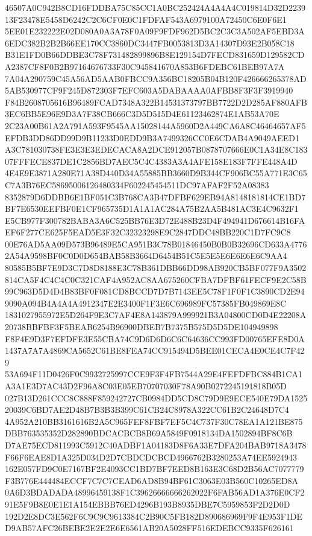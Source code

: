 \documentclass[UTF8,fontset=fandol,zihao=-4,a4paper]{ctexart}
\begin{document}
{{46507A0C942B8CD16FDDBA75C85CC1A0BC252424A4A4A4C019814D32D223913F23478E5458D6242C2C6CF0E0C1FDFAF543A6979100A72450C6E0F6E1
5EE01E232222E02D080A0A3A78F0A09F9FDF962D5BC2C3C3A502AF5EBD3A6EDC382B2B2B66EE170CC3860DC3447FB0053813D3A14307D93E2B058C18
B31E1FD0B66DDBE3C78F731482899896B8E129154D7FECD831659D129582CDA2387CF8F0B2B97164676733F30C945841670A853B6FDEBC61BEB97A7A
7A04A290759C45A56AD5AAB0FBCC9A356BC18205B04B120F426666265378AD5AB530977CF9F245D872303F7EFC603A5DABAAAA0AFBB8F3F3F3919940
F84B2608705616B96489FCAD7348A322B14531373797BB7722D2D285AF880AFB3EC6BB5E96E9D3A7F38CB666C3D5D515D4E61123462874E1AB53A70E
2C23A00B61A2A791A593F9545AA15028144A5960D2A449CA6A8C46464657AF5EFDB3DD86DD99D9B11233D0EDD9B3A7499326CC0E6CDAB4A9049AEED1
A3C781030738FE3E3E3EDECACA8A2DCE912057B0878707666E0C1A34E8C18307FFFECE837DE1C2856BD7AEC5C4C4383A3A4AFE158E183F7FFE448A4D
4E4E9E3871A280E71A38D440D34A55885BB3660D9B344CF906BC55A771E3C65C7A3B76EC58695006126480334F602245454511DC97AFAF2F52A08383
8352879D6DDBB6E1BF051C3B768CA3B47DFBF629EB94A8148181814CE1BD7BF7E6530EEFBF0E1CF965735D1A1A1AC284A75B2AA5B481AC3E4C9632F1
E5CB977F300782BABA3A6C525BB76E3D72E488B23D4F494941D676614B16FAEF6F277CE625F5EAD5E3F32C32323298E9C2847DDC48BB220C1D7FC9C8
00E76AD5AA09D573B96489E5CA951B3C78B01846450B0B0B32696CD633A47762A54A9598BF0C0D0D654BAB58B3664D6454B51C5E5E5E6E6E6E6C9AA4
80585B5BF7E9D3C7D8D8188E3C78B361DBB66DD98AB920CB5BF077F9A3502814CA5F4C4C4C0C321CAF4A952AC8AA675260CFBA7DFBF61FECF9E2C58B
99C963D5D4D4B83BF0F081CD8BCCD7D7B7143EE5C78F1F0F1C3890CD2E949090A094B4A4A4A4912347E2E3400F1F3E6C696989FC57385FB049869E8C
1831027955972E5D264F9E3C7AF4E8A143879A999921B3A04800CD0D4E22208A20738BBFBF3F5BEAB6254B96900DBEB7B7375B575D5D5DE104949898
F8F4E9D3F7EFDFE3E55CBA74C9D6D6D6C6C64636CC993FD00765EFE8D0A1437A7A7A4869CA5652C61BE8FEA74CC915494D5BEE01CECA4E0CE4C7F429
53A694F11D0426F0C9932725997CCE9F3F4FB7544A29E4FEFDFBC884B1CA1A3A1E3D7AC43D2F96A8C03E05EB70707030F78A90B0272245191818B05D
027B13D261CCC8C888F859242727CB0984DD5CD8C79D9E9ECE540E79DA152520039C6BD7AE2D48B7B3B3B399C61CB24C8978A322CC61B2C24648D7C4
4A952A210BB3161616B2A5C965FEF8FBF7EF5C4C737F30C78EA1A121BE875DBB763535352D282890BDCACBCB8B69A5849F0918134DA1502894BF8C6B
D7AE75ECD811993C5912C40ADBF1A04183D8F6A33E7DFA204BAB9718A3478F66F6EAE8D1A325D034D2D7CBDCDCBCD4966762B3280253A74EE5924943
162E057FD9C0E7167BF2E4093CC1BD7BF7EED8B163E3C68D2B56AC7077779F3B776E444484ECCF7C7C7CEAD6AD8B94BF61C3063E03B560C10265ED8A
0A6D3BDADADA48996459138F1C39626666666262022F6FAB56AD1A376E0CF291E5F9B8E0E1E1A154EBBB76ED4296B193B8935DBE7C5959853F2D2D0D
192D2E8DC3E562F6C9C9C9613384C2B90C5FB182D890686969F9F4E953F1DED9AB57AFC26BEBE2E2E2E6E6561AB20A5028FF516EDEBCC9335F626161
}}
\end{document}
